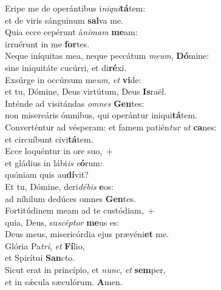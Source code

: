 \evenverse Eripe me de operántibus i\textit{ni}\textit{qui}\textbf{tá}tem:~\*\\
\evenverse et de viris sánguinum \textbf{sal}va me.\\
\oddverse Quia ecce cepérunt á\textit{ni}\textit{mam} \textbf{me}am:~\*\\
\oddverse irruérunt in me \textbf{for}tes.\\
\evenverse Neque iníquitas mea, neque peccátum \textit{me}\textit{um}, \textbf{Dó}mine:~\*\\
\evenverse sine iniquitáte cucúrri, et di\textbf{ré}xi.\\
\oddverse Exsúrge in occúrsum me\textit{um}, \textit{et} \textbf{vi}de:~\*\\
\oddverse et tu, Dómine, Deus virtútum, Deus \textbf{Is}raël.\\
\evenverse Inténde ad visitándas \textit{om}\textit{nes} \textbf{Gen}tes:~\*\\
\evenverse non misereáris ómnibus, qui operántur iniqui\textbf{tá}tem.\\
\oddverse Converténtur ad vésperam: et famem patién\textit{tur} \textit{ut} \textbf{ca}nes:~\*\\
\oddverse et circuíbunt civi\textbf{tá}tem.\\
\evenverse Ecce loquéntur in ore suo,~+\\
\evenverse  et gládius in lábi\textit{is} \textit{e}\textbf{ó}rum:~\*\\
\evenverse quóniam quis au\textbf{dí}vit?\\
\oddverse Et tu, Dómine, deri\textit{dé}\textit{bis} \textbf{e}os:~\*\\
\oddverse ad níhilum dedúces omnes \textbf{Gen}tes.\\
\evenverse Fortitúdinem meam ad te custódiam,~+\\
\evenverse  quia, Deus, su\textit{scép}\textit{tor} \textbf{me}us es:~\*\\
\evenverse Deus meus, misericórdia ejus prævéni\textbf{et} me.\\
\oddverse Glória Pa\textit{tri}, \textit{et} \textbf{Fí}lio,~\*\\
\oddverse et Spirítui \textbf{San}cto.\\
\evenverse Sicut erat in princípio, et \textit{nunc}, \textit{et} \textbf{sem}per,~\*\\
\evenverse et in sǽcula sæculórum. \textbf{A}men.\\
